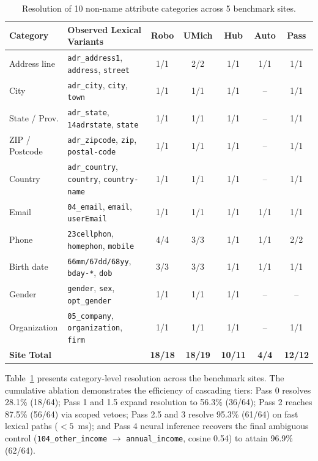 \documentclass[11pt,runningheads,a4paper]{llncs}
\begin{document}
\begin{table}[t]
\caption{Resolution of 10 non-name attribute categories across 5 benchmark sites.}
\label{tab:cat}
\centering
\scriptsize
\setlength{\tabcolsep}{4pt}
\begin{tabular}{l l c c c c c}
\toprule
\textbf{Category} & \textbf{Observed Lexical Variants} & \textbf{Robo} & \textbf{UMich} & \textbf{Hub} & \textbf{Auto} & \textbf{Pass} \\
\midrule
Address line & \texttt{adr\_address1}, \texttt{address}, \texttt{street} & 1/1 & 2/2 & 1/1 & 1/1 & 1/1 \\
City & \texttt{adr\_city}, \texttt{city}, \texttt{town} & 1/1 & 1/1 & 1/1 & -- & 1/1 \\
State / Prov. & \texttt{adr\_state}, \texttt{14adrstate}, \texttt{state} & 1/1 & 1/1 & 1/1 & -- & 1/1 \\
ZIP / Postcode & \texttt{adr\_zipcode}, \texttt{zip}, \texttt{postal-code} & 1/1 & 1/1 & 1/1 & -- & 1/1 \\
Country & \texttt{adr\_country}, \texttt{country}, \texttt{country-name} & 1/1 & 1/1 & 1/1 & -- & 1/1 \\
Email & \texttt{04\_email}, \texttt{email}, \texttt{userEmail} & 1/1 & 1/1 & 1/1 & 1/1 & 1/1 \\
Phone & \texttt{23cellphon}, \texttt{homephon}, \texttt{mobile} & 4/4 & 3/3 & 1/1 & 1/1 & 2/2 \\
Birth date & \texttt{66mm/67dd/68yy}, \texttt{bday-*}, \texttt{dob} & 3/3 & 3/3 & 1/1 & 1/1 & 1/1 \\
Gender & \texttt{gender}, \texttt{sex}, \texttt{opt\_gender} & 1/1 & 1/1 & 1/1 & -- & -- \\
Organization & \texttt{05\_company}, \texttt{organization}, \texttt{firm} & 1/1 & 1/1 & 1/1 & -- & 1/1 \\
\midrule
\textbf{Site Total} & & \textbf{18/18} & \textbf{18/19} & \textbf{10/11} & \textbf{4/4} & \textbf{12/12} \\
\bottomrule
\end{tabular}
\end{table}

Table~\ref{tab:cat} presents category-level resolution across the benchmark sites. The cumulative ablation demonstrates the efficiency of cascading tiers: Pass 0 resolves 28.1\% (18/64); Pass 1 and 1.5 expand resolution to 56.3\% (36/64); Pass 2 reaches 87.5\% (56/64) via scoped vetoes; Pass 2.5 and 3 resolve 95.3\% (61/64) on fast lexical paths ($<5$~ms); and Pass 4 neural inference recovers the final ambiguous control (\texttt{104\_other\_income} $\to$ \texttt{annual\_income}, cosine 0.54) to attain 96.9\% (62/64).
\end{document}
